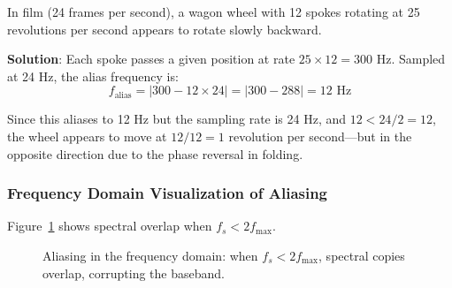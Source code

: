 \begin{examplebox}
In film (24 frames per second), a wagon wheel with 12 spokes rotating at 25 revolutions per second appears to rotate slowly backward.

\textbf{Solution}: Each spoke passes a given position at rate $25 \times 12 = 300$ Hz. Sampled at 24 Hz, the alias frequency is:
\begin{equation*}
f_{\text{alias}} = |300 - 12 \times 24| = |300 - 288| = 12 \text{ Hz}
\end{equation*}

Since this aliases to 12 Hz but the sampling rate is 24 Hz, and $12 < 24/2 = 12$, the wheel appears to move at $12/12 = 1$ revolution per second---but in the opposite direction due to the phase reversal in folding.
\end{examplebox}

\subsubsection{Frequency Domain Visualization of Aliasing}

Figure~\ref{fig:aliasing_spectrum} shows spectral overlap when $f_s < 2f_{\max}$.

\begin{figure}[htbp]
\centering
{}
\caption{Aliasing in the frequency domain: when $f_s < 2f_{\max}$, spectral copies overlap, corrupting the baseband.}
\label{fig:aliasing_spectrum}
\end{figure}

